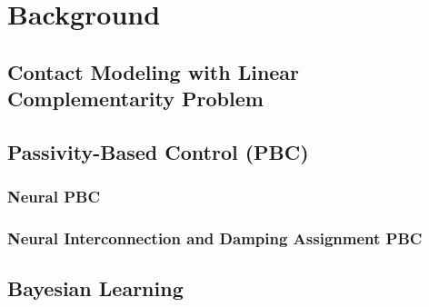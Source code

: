 \chapter{Background}
\label{ch:background}

\section{Contact Modeling with Linear Complementarity Problem}

\section{Passivity-Based Control (PBC)}

\subsection{Neural PBC}
\subsection{Neural Interconnection and Damping Assignment PBC}

\section{Bayesian Learning}


